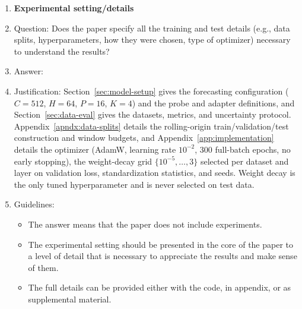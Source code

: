\begin{enumerate}
\begin{itemize}
        \item The authors should provide instructions on data access and preparation, including how to access the raw data, preprocessed data, intermediate data, and generated data, etc.
        \item The authors should provide scripts to reproduce all experimental results for the new proposed method and baselines. If only a subset of experiments are reproducible, they should state which ones are omitted from the script and why.
        \item At submission time, to preserve anonymity, the authors should release anonymized versions (if applicable).
        \item Providing as much information as possible in supplemental material (appended to the paper) is recommended, but including URLs to data and code is permitted.
    \end{itemize}

\item {\bf Experimental setting/details}
    \item[] Question: Does the paper specify all the training and test details (e.g., data splits, hyperparameters, how they were chosen, type of optimizer) necessary to understand the results?
    \item[] Answer: \answerYes{}
    \item[] Justification: Section~\ref{sec:model-setup} gives the forecasting configuration (\(C=512\), \(H=64\), \(P=16\), \(K=4\)) and the probe and adapter definitions, and Section~\ref{sec:data-eval} gives the datasets, metrics, and uncertainty protocol. Appendix~\ref{apndx:data-splits} details the rolling-origin train/validation/test construction and window budgets, and Appendix~\ref{app:implementation} details the optimizer (AdamW, learning rate \(10^{-2}\), 300 full-batch epochs, no early stopping), the weight-decay grid \(\{10^{-5},\dots,3\}\) selected per dataset and layer on validation loss, standardization statistics, and seeds. Weight decay is the only tuned hyperparameter and is never selected on test data.
    \item[] Guidelines:
    \begin{itemize}
        \item The answer \answerNA{} means that the paper does not include experiments.
        \item The experimental setting should be presented in the core of the paper to a level of detail that is necessary to appreciate the results and make sense of them.
        \item The full details can be provided either with the code, in appendix, or as supplemental material.
    \end{itemize}


\end{enumerate}
